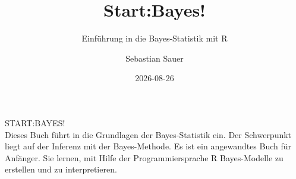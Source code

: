 \documentclass[
  ngerman,
  letterpaper,
  twoside,
  open=any]{scrbook}
\title{Start:Bayes!}
\subtitle{Einführung in die Bayes-Statistik mit R}
\author{Sebastian Sauer}
\date{2026-08-26}
\theoremstyle{definition}
\theoremstyle{plain}
\theoremstyle{definition}
\theoremstyle{definition}
\theoremstyle{remark}
\begin{document}

  \begin{frontmatter}



\begin{titlepage}
    \centering
    \vspace*{3cm}
    {\Huge START:BAYES!\\}
    \vspace*{2cm}
    \noindent %
Dieses Buch führt in die Grundlagen der Bayes-Statistik ein.
Der Schwerpunkt liegt auf der Inferenz mit der Bayes-Methode.
Es ist ein angewandtes Buch für Anfänger.
Sie lernen, mit Hilfe der Programmiersprache R Bayes-Modelle
zu erstellen und zu interpretieren.

    \vfill
\end{titlepage}


\newpage
\null
\thispagestyle{empty} %
\newpage



\begin{titlepage}


\newcommand{\titlepagepagealign}{
\ifthenelse{\equal{center}{right}}{\raggedleft}{}
\ifthenelse{\equal{center}{center}}{\centering}{}
\ifthenelse{\equal{center}{left}}{\raggedright}{}
}


\newcommand{\titleandsubtitle}{
{\fontsize{30}{36.0}\selectfont
{\uppercase{\nohyphens{Start:Bayes!}}}\par
}%

\vspace{\betweentitlesubtitle}
{
{\Large{\textit{\nohyphens{Einführung in die Bayes-Statistik mit
R}}}}\par
}}
\newcommand{\titlepagetitleblock}{
\rule{\textwidth}{0.4pt} %
\vspace{0.025\textheight} %

\titleandsubtitle

\vspace{0.025\textheight} 
\rule{0.3\textwidth}{0.4pt} %
}
\newcommand{\authorstyle}[1]{{\Large{#1}}}

\newcommand{\affiliationstyle}[1]{{\large{#1}}}

\newcommand{\titlepageauthorblock}{
{\authorstyle{\nohyphens{Sebastian Sauer}\\}}
}


\end{titlepage}
\end{frontmatter}
\end{document}
